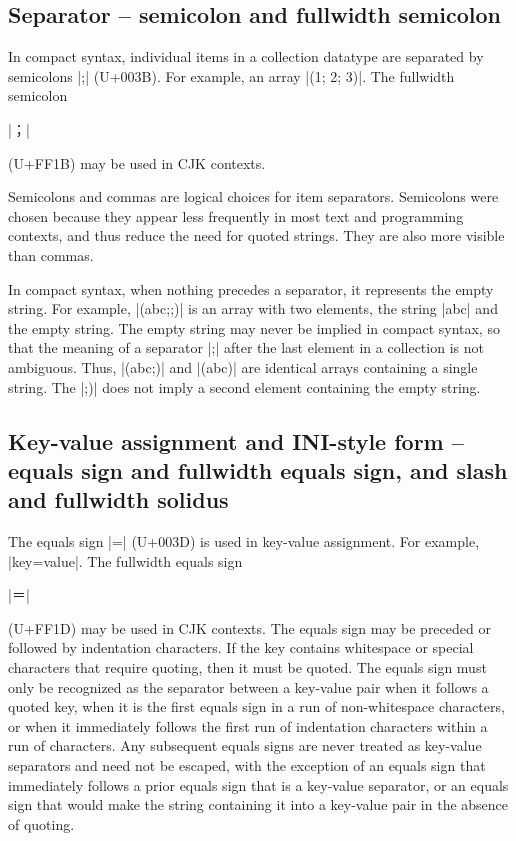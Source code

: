 \documentclass[11pt]{article}
\begin{document}
\subsection{Separator -- semicolon and fullwidth semicolon}

In compact syntax, individual items in a collection datatype are separated by semicolons |;| (U+003B).  For example, an array |(1; 2; 3)|.  The fullwidth semicolon \begin{CJK*}{UTF8}{gkai}|；|\end{CJK*} (U+FF1B) may be used in CJK contexts.

Semicolons and commas are logical choices for item separators.  Semicolons were chosen because they appear less frequently in most text and programming contexts, and thus reduce the need for quoted strings.  They are also more visible than commas.

In compact syntax, when nothing precedes a separator, it represents the empty string.  For example, |(abc;;)| is an array with two elements, the string |abc| and the empty string.  The empty string may never be implied in compact syntax, so that the meaning of a separator |;| after the last element in a collection is not ambiguous.  Thus, |(abc;)| and |(abc)| are identical arrays containing a single string.  The |;)| does not imply a second element containing the empty string.


\subsection{Key-value assignment and INI-style form -- equals sign and fullwidth equals sign, and slash and fullwidth solidus}

The equals sign |=| (U+003D) is used in key-value assignment.  For example, |key=value|.  The fullwidth equals sign \begin{CJK*}{UTF8}{gkai}|＝|\end{CJK*} (U+FF1D) may be used in CJK contexts.  The equals sign may be preceded or followed by indentation characters.  If the key contains whitespace or special characters that require quoting, then it must be quoted.  The equals sign must only be recognized as the separator between a key-value pair when it follows a quoted key, when it is the first equals sign in a run of non-whitespace characters, or when it immediately follows the first run of indentation characters within a run of characters.  Any subsequent equals signs are never treated as key-value separators and need not be escaped, with the exception of an equals sign that immediately follows a prior equals sign that is a key-value separator, or an equals sign that would make the string containing it into a key-value pair in the absence of quoting.
\end{document}
